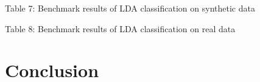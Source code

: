 \documentclass[11pt]{article}
\begin{document}
\begin{center}

\end{center}
Table 7: Benchmark results of LDA classification on synthetic data

\begin{center}

\end{center}
Table 8: Benchmark results of LDA classification on real data

\section{Conclusion}
\begin{adjustbox}{width=\columnwidth,center}

\end{adjustbox}
\end{document}
